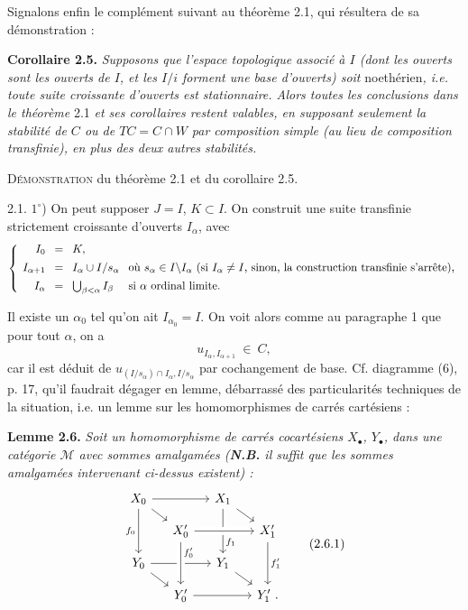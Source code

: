 \documentclass[11pt]{article}
\newcommand{\printedpage}[1]{\marginpar{\footnotesize p.~#1\ifstrequal{#1}{1}{\\[2pt]{[page 1]}}{}}}
\newcommand{\msp}[1]{\ifstrequal{#1}{page 1}{}{\marginpar{\footnotesize [#1]}}}
\newcommand{\M}{\mathcal{M}}
\begin{document}
Signalons enfin le complément suivant au théorème 2.1, qui résultera de sa démonstration :

\textbf{Corollaire 2.5.} \textit{Supposons que l'espace topologique associé à $I$ (dont les ouverts sont les ouverts de $I$, et les $I/i$ forment une base d'ouverts) soit} \textup{noethérien}\textit{, i.e. toute suite croissante d'ouverts est stationnaire. Alors toutes les conclusions dans le théorème} \textup{2.1} \textit{et ses corollaires restent valables, en supposant seulement la stabilité de $C$ ou de $TC = C \cap W$ par composition simple (au lieu de composition transfinie), en plus des deux autres stabilités.}

\printedpage{17}

\msp{page 30}

\textsc{Démonstration} du théorème 2.1 et du corollaire 2.5.

2.1. $1^\circ$) On peut supposer $J = I$, $K \subset I$. On construit une suite transfinie strictement croissante d'ouverts $I_\alpha$, avec
\[
\left\{
\setlength{\arraycolsep}{4pt}
\begin{array}{rcll}
I_0 & = & K, & \\[1ex]
I_{\alpha+1} & = & I_\alpha \cup I/s_\alpha & \text{où } s_\alpha \in I\backslash I_\alpha \text{ (si } I_\alpha \neq I\text{, sinon, la construction transfinie s'arrête),}\\[1ex]
I_\alpha & = & \bigcup_{\beta<\alpha} I_\beta & \text{si } \alpha \text{ ordinal limite.}
\end{array}
\right.
\]

Il existe un $\alpha_0$ tel qu'on ait $I_{\alpha_0} = I$. On voit alors comme au paragraphe 1
\msp{page 31}
que pour tout $\alpha$, on a
\[
u_{I_\alpha,I_{\alpha+1}} \ \in\ C,
\tag*{$(*)$}
\]
car il est déduit de $u_{(I/s_\alpha)\cap I_\alpha,I/s_\alpha}$ par cochangement de base. Cf. diagramme (6), p. 17, qu'il faudrait dégager en lemme, débarrassé des particularités techniques de la situation, i.e. un lemme sur les homomorphismes de carrés cartésiens :

\textbf{Lemme 2.6.} \textit{Soit un homomorphisme de carrés cocartésiens $X_\bullet$, $Y_\bullet$, dans une catégorie $\M$ avec sommes amalgamées (\textbf{N.B.} il suffit que les sommes amalgamées intervenant ci-dessus existent) :}
\[
\begin{tikzcd}[row sep=small, column sep=small]
X_0 \arrow[rr] \arrow[dr] \arrow[dd, "f_0"'] & & X_1 \arrow[dr] \arrow[dd, "f_1" near end] & \\
 & X'_0 \arrow[rr, crossing over] & & X'_1 \arrow[dd, "f'_1"] \\
Y_0 \arrow[rr] \arrow[dr] & & Y_1 \arrow[dr] & \\
 & Y'_0 \arrow[rr] \arrow[from=uu, crossing over, "f'_0" near start] & & Y'_1 \ .
\end{tikzcd}
\tag*{(2.6.1)}
\]
\end{document}
